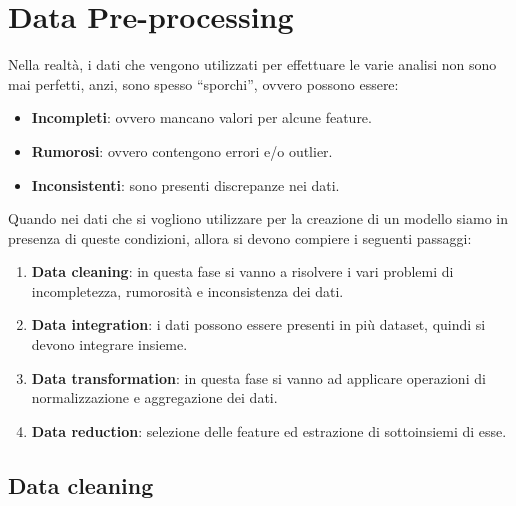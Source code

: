 \chapter{Data Pre-processing}
Nella realtà, i dati che vengono utilizzati per effettuare le varie analisi non
sono mai perfetti, anzi, sono spesso ``sporchi'', ovvero possono essere:
\begin{itemize}
      \item \textbf{Incompleti}: ovvero mancano valori per alcune feature.
      \item \textbf{Rumorosi}: ovvero contengono errori e/o outlier.
      \item \textbf{Inconsistenti}: sono presenti discrepanze nei dati.
\end{itemize}
Quando nei dati che si vogliono utilizzare per la creazione di un modello siamo
in presenza di queste condizioni, allora si devono compiere i seguenti passaggi:
\begin{enumerate}
      \item \textbf{Data cleaning}: in questa fase si vanno a risolvere i vari
            problemi di incompletezza, rumorosità e inconsistenza dei dati.
      \item \textbf{Data integration}: i dati possono essere presenti in più
            dataset, quindi si devono integrare insieme.
      \item \textbf{Data transformation}: in questa fase si vanno ad applicare
            operazioni di normalizzazione e aggregazione dei dati.
      \item \textbf{Data reduction}: selezione delle feature ed estrazione di
            sottoinsiemi di esse.
\end{enumerate}
\section{Data cleaning}
